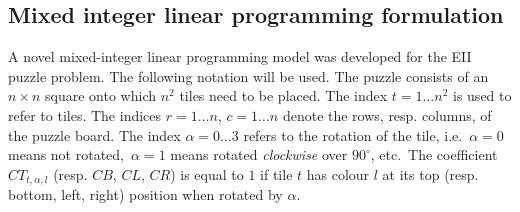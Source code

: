 \documentclass[preprint,12pt]{elsarticle}
\begin{document}
\subsection{Mixed integer linear programming formulation}
\label{subsec:MILP}
\noindent
A novel mixed-integer linear programming model was developed for the EII puzzle problem.
The following notation will be used. The puzzle consists of an $n\times n$ square onto which $n^2$ tiles need to be placed.
The index $t = 1 \ldots n^2$ is used to refer to tiles.
The indices $r = 1 \ldots n$, $c = 1 \ldots n$ denote the rows, resp. columns, of the puzzle board.
The index $\alpha = 0\ldots 3$ refers to the rotation of the tile, i.e.\ $\alpha = 0$ means not rotated,\ $\alpha = 1$ means rotated \emph{clockwise} over $90^\circ$, etc.\ 
The coefficient $CT_{t,\alpha,l}$ (resp. $CB$, $CL$, $CR$) is equal to $1$ if tile $t$ has colour $l$ at its top (resp. bottom, left, right) position when rotated by $\alpha$.\\
\end{document}
